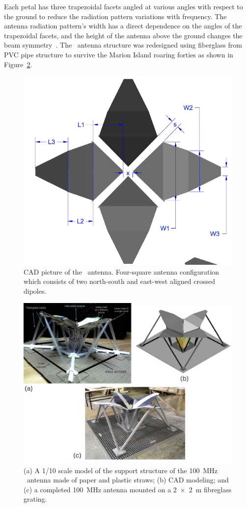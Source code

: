 Each petal has three trapezoidal facets angled at various angles with respect to the ground to reduce the radiation pattern variations with frequency. The antenna radiation pattern's width has a direct dependence on the angles of the trapezoidal facets, and the height of the antenna above the ground changes the beam symmetry~\citep{2014ApJ...782L...9V}.  The \prizm\ antenna structure was redesigned using fiberglass from PVC pipe structure to survive the Marion Island roaring forties as shown in Figure~\ref{Fig:structure}.  

\begin{figure}
	\centering
	\includegraphics[width=0.7\linewidth]{Figures/petals.pdf}
	\caption{CAD picture of the \prizm\ antenna. Four-square antenna configuration which consists of two north-south and east-west aligned crossed dipoles.}
	\label{Fig:petals}
\end{figure}

\begin{figure}
	\centering
	\includegraphics[width=0.7\linewidth]{Figures/structure}
	\caption{(a) A 1/10 scale model of the support structure of the \SI{100}{\mega \hertz} \prizm\ antenna made of paper and plastic straws; (b) CAD modeling; and (c) a completed \SI{100}{\mega \hertz} antenna mounted on a \SI{2x2}{\meter} fibreglass grating.}
	\label{Fig:structure}
\end{figure}

